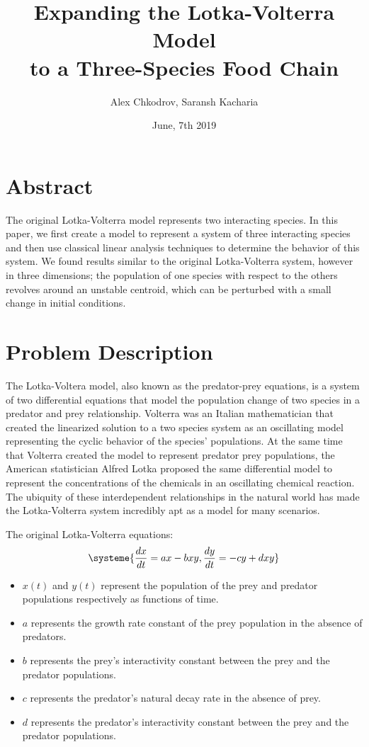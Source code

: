 \documentclass[11pt,oneside]{article}
\title{Expanding the Lotka-Volterra Model\\ to a Three-Species Food Chain}
\author{Alex Chkodrov, Saransh Kacharia}
\date{June, 7th 2019}
\begin{document}
	\maketitle
	\pagestyle{fancy}
	\section{Abstract}
	The original Lotka-Volterra model represents two interacting species. In this paper, we first create a model to represent a system of three interacting species and then use classical linear analysis techniques to determine the behavior of this system. We found results similar to the original Lotka-Volterra system, however in three dimensions; the population of one species with respect to the others revolves around an unstable centroid, which can be perturbed with a small change in initial conditions.
	
	\section{Problem Description}
	The Lotka-Voltera model, also known as the predator-prey equations, is a system of two differential equations that model the population change of two species in a predator and prey relationship. Volterra was an Italian mathematician that created the linearized solution to a two species system as an oscillating model representing the cyclic behavior of the species' populations. At the same time that Volterra created the model to represent predator prey populations, the American statistician Alfred Lotka proposed the same differential model to represent the  concentrations of the chemicals in an oscillating chemical reaction. The ubiquity of these interdependent relationships in the natural world has made the Lotka-Volterra system incredibly apt as a model for many scenarios.
	
	The original Lotka-Volterra equations:
	\begin{equation}
	\systeme{
		\frac{dx}{dt} = ax - bxy,
		\frac{dy}{dt} = -cy + dxy
	}
	\end{equation}
	\begin{itemize}
		\item $x(t)$ and $y(t)$ represent the population of the prey and predator populations respectively as functions of time.
		\item $a$ represents the growth rate constant of the prey population in the absence of predators.
		\item $b$ represents the prey's interactivity constant between the prey and the predator populations.
		\item $c$ represents the predator's natural decay rate in the absence of prey.
		\item $d$ represents the predator's interactivity constant between the prey and the predator populations.
	\end{itemize}
	
\end{document}
